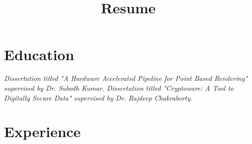 \documentclass[11pt,a4paper,sans]{moderncv}        %
\title{Resume}                               %
\begin{document}
\makecvtitle

\section{Education}
{\emph{Dissertation titled "A Hardware Accelerated Pipeline for Point Based Rendering" supervised by Dr. Subodh Kumar.}}
{\emph{Dissertation titled "Cryptoware: A Tool to Digitally Secure Data" supervised by Dr. Rajdeep Chakraborty.}}

\section{Experience}
\end{document}
